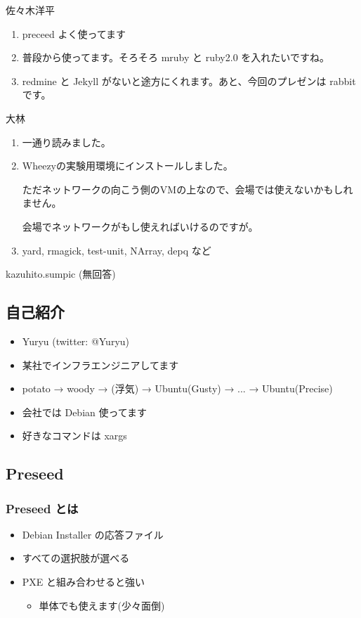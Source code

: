 \documentclass[mingoth,a4paper]{jsarticle}
\begin{document}
\begin{prework}{ 佐々木洋平 }
  \begin{enumerate}
  \item preceed よく使ってます
  \item 普段から使ってます。そろそろ mruby と ruby2.0 を入れたいですね。
  \item redmine と Jekyll がないと途方にくれます。あと、今回のプレゼンは rabbit です。
  \end{enumerate}
\end{prework}

\begin{prework}{ 大林 }
  \begin{enumerate}
  \item 一通り読みました。
  \item Wheezyの実験用環境にインストールしました。

    ただネットワークの向こう側のVMの上なので、会場では使えないかもしれません。

    会場でネットワークがもし使えればいけるのですが。
  \item yard, rmagick, test-unit, NArray, depq など
  \end{enumerate}
\end{prework}

\begin{prework}{ kazuhito.sumpic }
(無回答)
\end{prework}


\subsection{自己紹介}
\begin{itemize}
\item Yuryu (twitter: @Yuryu)
\item 某社でインフラエンジニアしてます
\item potato → woody → (浮気) → Ubuntu(Gusty) → ... → Ubuntu(Precise)
\item 会社では Debian 使ってます
\item 好きなコマンドは xargs
\end{itemize}

\subsection{Preseed}
\subsubsection{Preseed とは}
\begin{itemize}
\item Debian Installer の応答ファイル
\item すべての選択肢が選べる
\item PXE と組み合わせると強い
  \begin{itemize}
  \item 単体でも使えます(少々面倒)
  \end{itemize}
\end{itemize}
\end{document}
